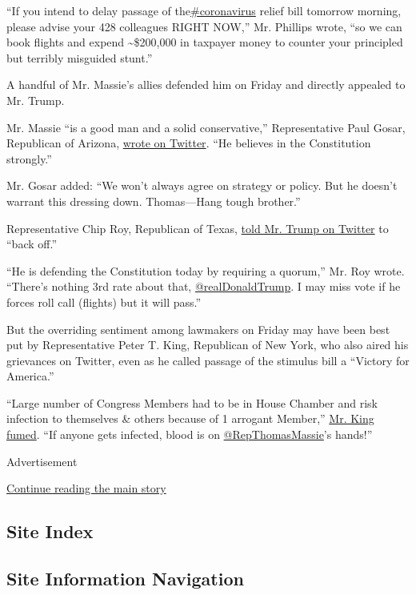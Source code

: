 ``If you intend to delay passage of
the\href{https://twitter.com/hashtag/coronavirus?src=hashtag_click}{\#coronavirus}
relief bill tomorrow morning, please advise your 428 colleagues RIGHT
NOW,'' Mr. Phillips wrote, ``so we can book flights and expend
\textasciitilde{}\$200,000 in taxpayer money to counter your principled
but terribly misguided stunt.''

A handful of Mr. Massie's allies defended him on Friday and directly
appealed to Mr. Trump.

Mr. Massie ``is a good man and a solid conservative,'' Representative
Paul Gosar, Republican of Arizona,
\href{https://twitter.com/DrPaulGosar/status/1243546289175961608?s=20}{wrote
on Twitter}. ``He believes in the Constitution strongly.''

Mr. Gosar added: ``We won't always agree on strategy or policy. But he
doesn't warrant this dressing down. Thomas---Hang tough brother.''

Representative Chip Roy, Republican of Texas,
\href{https://twitter.com/chiproytx/status/1243542668367613952?s=20}{told
Mr. Trump on Twitter} to ``back off.''

``He is defending the Constitution today by requiring a quorum,'' Mr.
Roy wrote. ``There's nothing 3rd rate about that,
\href{https://twitter.com/realDonaldTrump/}{@realDonaldTrump}. I may
miss vote if he forces roll call (flights) but it will pass.''

But the overriding sentiment among lawmakers on Friday may have been
best put by Representative Peter T. King, Republican of New York, who
also aired his grievances on Twitter, even as he called passage of the
stimulus bill a ``Victory for America.''

``Large number of Congress Members had to be in House Chamber and risk
infection to themselves \& others because of 1 arrogant Member,''
\href{https://twitter.com/RepPeteKing/status/1243595215828549635?s=20}{Mr.
King fumed}. ``If anyone gets infected, blood is on
\href{https://twitter.com/RepThomasMassie}{@RepThomasMassie}'s hands!''

Advertisement

\protect\hyperlink{after-bottom}{Continue reading the main story}

\hypertarget{site-index}{%
\subsection{Site Index}\label{site-index}}

\hypertarget{site-information-navigation}{%
\subsection{Site Information
Navigation}\label{site-information-navigation}}

